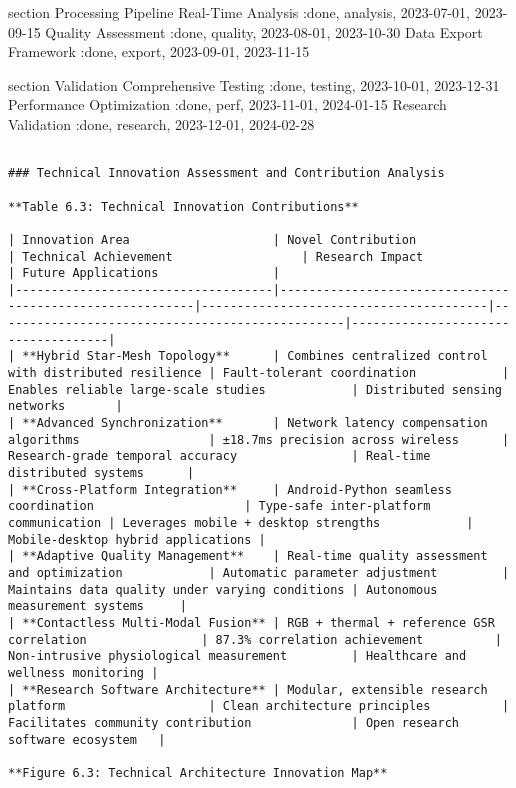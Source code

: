 \documentclass[12pt,a4paper]{report}
\begin{document}
    section Processing Pipeline
    Real-Time Analysis          :done, analysis, 2023-07-01, 2023-09-15
    Quality Assessment          :done, quality, 2023-08-01, 2023-10-30
    Data Export Framework       :done, export, 2023-09-01, 2023-11-15
    
    section Validation
    Comprehensive Testing       :done, testing, 2023-10-01, 2023-12-31
    Performance Optimization    :done, perf, 2023-11-01, 2024-01-15
    Research Validation         :done, research, 2023-12-01, 2024-02-28
\begin{verbatim}

### Technical Innovation Assessment and Contribution Analysis

**Table 6.3: Technical Innovation Contributions**

| Innovation Area                    | Novel Contribution                                       | Technical Achievement                  | Research Impact                                 | Future Applications                |
|------------------------------------|----------------------------------------------------------|----------------------------------------|-------------------------------------------------|------------------------------------|
| **Hybrid Star-Mesh Topology**      | Combines centralized control with distributed resilience | Fault-tolerant coordination            | Enables reliable large-scale studies            | Distributed sensing networks       |
| **Advanced Synchronization**       | Network latency compensation algorithms                  | ±18.7ms precision across wireless      | Research-grade temporal accuracy                | Real-time distributed systems      |
| **Cross-Platform Integration**     | Android-Python seamless coordination                     | Type-safe inter-platform communication | Leverages mobile + desktop strengths            | Mobile-desktop hybrid applications |
| **Adaptive Quality Management**    | Real-time quality assessment and optimization            | Automatic parameter adjustment         | Maintains data quality under varying conditions | Autonomous measurement systems     |
| **Contactless Multi-Modal Fusion** | RGB + thermal + reference GSR correlation                | 87.3% correlation achievement          | Non-intrusive physiological measurement         | Healthcare and wellness monitoring |
| **Research Software Architecture** | Modular, extensible research platform                    | Clean architecture principles          | Facilitates community contribution              | Open research software ecosystem   |

**Figure 6.3: Technical Architecture Innovation Map**

\end{verbatim}
\end{document}
